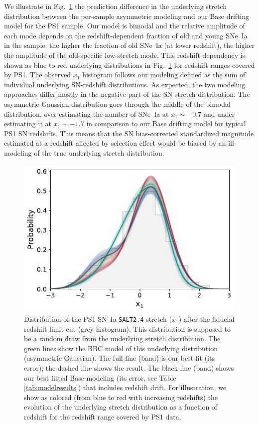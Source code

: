 \documentclass[]{aa}
\begin{document}
We illustrate in Fig.~\ref{fig:bbc_pdf_ps1} the prediction difference in the
underlying stretch distribution between the per-sample asymmetric modeling and
our Base drifting model for the PS1 sample. Our model is bimodal and the
relative amplitude of each mode depends on the redshift-dependent fraction of
old and young SNe~Ia in the sample: the higher the fraction of old SNe~Ia (at
lower redshift), the higher the amplitude of the old-specific low-stretch mode.
This redshift dependency is shown as blue to red underlying distributions in
Fig.~\ref{fig:bbc_pdf_ps1} for redshift ranges covered by PS1. The observed
$x_1$ histogram follows our modeling defined as the sum of individual underlying
SN-redshift distributions. As expected, the two modeling approaches differ
mostly in the negative part of the SN stretch distribution. The asymmetric
Gaussian distribution goes through the middle of the bimodal distribution,
over-estimating the number of SNe~Ia at $x_1\sim-0.7$ and under-estimating it at
$x_1\sim-1.7$ in comparison to our Base drifting model for typical PS1 SN
redshifts. This means that the SN bias-corrected standardized magnitude
estimated at a redshift affected by selection effect would be biased by an
ill-modeling of the true underlying stretch distribution.

\begin{figure}
    \centering
    \includegraphics[width=\linewidth]{Article_figures/bbc_comp_PS1_hist-nr.pdf}
    \caption{Distribution of the PS1 SN~Ia \textsc{\texttt{SALT2.4}} stretch
        ($x_1$) after the fiducial redshift limit cut (grey histogram). This
        distribution is supposed to be a random draw from the underlying stretch
        distribution. The green lines show the BBC model of this underlying
        distribution (asymmetric Gaussian). The full line (band) is our best fit
        (its error); the dashed line shows the \cite{scolnic2018a} result. The
        black line (band) shows our best fitted Base-modeling (its error, see
        Table \ref{tab:modelresults}) that includes redshift drift. For
        illustration, we show as colored (from blue to red with increasing
        redshifts) the evolution of the underlying stretch distribution as a
        function of redshift for the redshift range covered by PS1 data.}
    \label{fig:bbc_pdf_ps1}
\end{figure}
\end{document}
